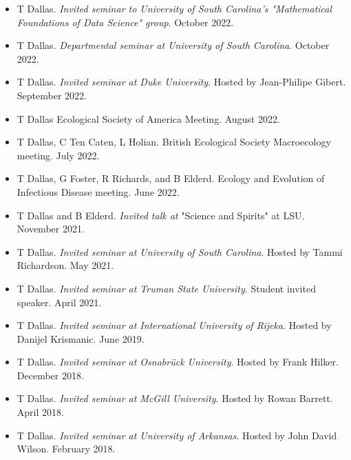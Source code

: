 \documentclass[]{CV}
\begin{document}
\begin{itemize}

\item {\mefont T Dallas}. \textit{Invited seminar to University of South Carolina's "Mathematical Foundations of Data Science" group}. October 2022. 

\item {\mefont T Dallas}. \textit{Departmental seminar at University of South Carolina}. October 2022. 

\item {\mefont T Dallas}. \textit{Invited seminar at Duke University}. Hosted by Jean-Philipe Gibert. September 2022. 
 
\item {\mefont T Dallas} Ecological Society of America Meeting. August 2022.

\item {\mefont T Dallas}, C Ten Caten, L Holian. British Ecological Society Macroecology meeting. July 2022.

\item {\mefont T Dallas}, G Foster, R Richards, and B Elderd. Ecology and Evolution of Infectious Disease meeting. June 2022.  

\item {\mefont T Dallas} and B Elderd. \textit{Invited talk at} "Science and Spirits" at LSU. November 2021. 

\item {\mefont T Dallas}. \textit{Invited seminar at University of South Carolina}. Hosted by Tammi Richardson. May 2021. 

\item {\mefont T Dallas}. \textit{Invited seminar at Truman State University}. Student invited speaker. April 2021. 

\item {\mefont T Dallas}. \textit{Invited seminar at International University of Rijeka}. Hosted by Danijel Krismanic. June 2019.

\item {\mefont T Dallas}. \textit{Invited seminar at Osnabr\"uck University}. Hosted by Frank Hilker. December 2018.

\item {\mefont T Dallas}. \textit{Invited seminar at McGill University}. Hosted by Rowan Barrett. April 2018. 

\item {\mefont T Dallas}. \textit{Invited seminar at University of Arkansas}. Hosted by John David Wilson. February 2018. 


\end{itemize}
\end{document}
